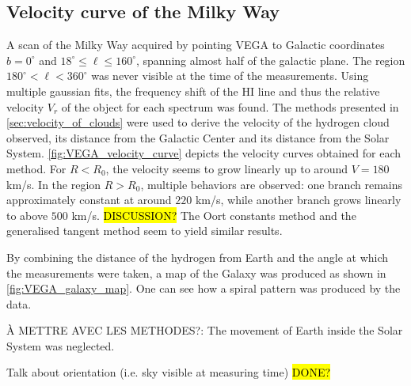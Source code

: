 \subsection{Velocity curve of the Milky Way}
A scan of the Milky Way acquired by pointing VEGA to Galactic coordinates $b = 0^\circ$ and $18^\circ \leq \ell \leq 160^\circ$, spanning almost half of the galactic plane. The region $180^\circ < \ell < 360^\circ$ was never visible at the time of the measurements.
Using multiple gaussian fits, the frequency shift of the HI line and thus the relative velocity $V_r$ of the object for each spectrum was found. The methods presented in \autoref{sec:velocity_of_clouds} were used to derive the velocity of the hydrogen cloud observed, its distance from the Galactic Center and its distance from the Solar System.
\autoref{fig:VEGA_velocity_curve} depicts the velocity curves obtained for each method. For $R < R_0$, the velocity seems to grow linearly up to around $V=180$ km/s. In the region $R > R_0$, multiple behaviors are observed: one branch remains approximately constant at around $220$ km/s, while another branch grows linearly to above $500$ km/s.
\hl{DISCUSSION?} The Oort constants method and the generalised tangent method seem to yield similar results.

By combining the distance of the hydrogen from Earth and the angle at which the measurements were taken, a map of the Galaxy was produced as shown in \autoref{fig:VEGA_galaxy_map}. One can see how a spiral pattern was produced by the data.

À METTRE AVEC LES METHODES?: The movement of Earth inside the Solar System was neglected.

Talk about orientation (i.e. sky visible at measuring time) \hl{DONE?}

